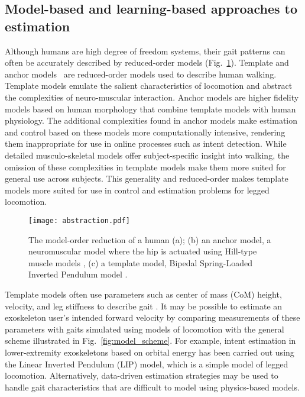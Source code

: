 \subsection{Model-based and learning-based approaches to estimation}\label{sec:model_v_learning}
Although humans are high degree of freedom systems, their gait patterns can often be accurately described by reduced-order models (Fig.~\ref{fig:abstraction}). Template and anchor models~\cite{full1999templates} are reduced-order models used to describe human walking. Template models emulate the salient characteristics of locomotion and abstract the complexities of neuro-muscular interaction. Anchor models are higher fidelity models based on human morphology that combine template models with human physiology. The additional complexities found in anchor models make estimation and control based on these models more computationally intensive, rendering them inappropriate for use in online processes such as intent detection. While detailed musculo-skeletal models offer subject-specific insight into walking, the omission of these complexities in template models make them more suited for general use across subjects. This generality and reduced-order makes template models more suited for use in control and estimation problems for legged locomotion.

\begin{figure}
	\centering
	\texttt{[image: abstraction.pdf]}
	\caption[The model-order reduction of (a) a human; (b) an anchor model, a neuromuscular model where the hip is actuated using Hill-type muscle models, (c) a template model, Bipedal Spring-Loaded Inverted Pendulum model]{The model-order reduction of a human (a); (b) an anchor model, a neuromuscular model where the hip is actuated using Hill-type muscle models \cite{davoodi2019template}, (c) a template model, Bipedal Spring-Loaded Inverted Pendulum model \cite{geyer2006compliant}. }\label{fig:abstraction}
\end{figure}


Template models often use parameters such as center of mass (CoM) height, velocity, and leg stiffness to describe gait \cite{geyer2006compliant,liu2015dynamic,full1999templates,sharbafi2015fmch}. It may be possible to estimate an exoskeleton user's intended forward velocity by comparing measurements of these parameters with gaits simulated using models of locomotion with the general scheme illustrated in Fig.~\ref{fig:model_scheme}. For example, intent estimation in lower-extremity exoskeletons based on orbital energy \cite{chen2018dynamic} has been carried out using the Linear Inverted Pendulum (LIP) model, which is a simple model of legged locomotion.  Alternatively, data-driven estimation strategies \cite{ge2011neural, kalinowska2019data, joukov2017rhythmic} may be used to handle gait characteristics that are difficult to model using physics-based models.
%

